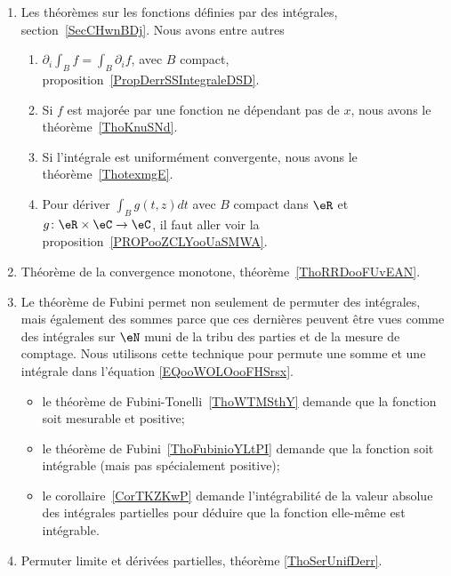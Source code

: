 
\begin{enumerate}
    \item
        Les théorèmes sur les fonctions définies par des intégrales, section~\ref{SecCHwnBDj}. Nous avons entre autres
        \begin{enumerate}
            \item
                \( \partial_i\int_Bf=\int_B\partial_if\), avec \( B\) compact, proposition~\ref{PropDerrSSIntegraleDSD}.
            \item
                Si \( f\) est majorée par une fonction ne dépendant pas de \( x\), nous avons le théorème~\ref{ThoKnuSNd}.
            \item
                Si l'intégrale est uniformément convergente, nous avons le théorème~\ref{ThotexmgE}.
            \item
                Pour dériver \( \int_Bg(t,z)dt\) avec \( B\) compact dans \( \eR\) et \( g\colon \eR\times \eC\to \eC\), il faut aller voir la proposition~\ref{PROPooZCLYooUaSMWA}.
        \end{enumerate}
    \item
        Théorème de la convergence monotone, théorème~\ref{ThoRRDooFUvEAN}.
    \item
        Le théorème de Fubini permet non seulement de permuter des intégrales, mais également des sommes parce que ces dernières peuvent être vues comme des intégrales sur \( \eN\) muni de la tribu des parties et de la mesure de comptage. Nous utilisons cette technique pour permute une somme et une intégrale dans l'équation \eqref{EQooWOLOooFHSrsx}.
\begin{itemize}
    \item
        le théorème de Fubini-Tonelli~\ref{ThoWTMSthY} demande que la fonction soit mesurable et positive;
    \item
        le théorème de Fubini~\ref{ThoFubinioYLtPI} demande que la fonction soit intégrable (mais pas spécialement positive);
    \item
        le corollaire~\ref{CorTKZKwP} demande l'intégrabilité de la valeur absolue des intégrales partielles pour déduire que la fonction elle-même est intégrable.
\end{itemize}


\item Permuter limite et dérivées partielles, théorème \ref{ThoSerUnifDerr}.

\end{enumerate}

